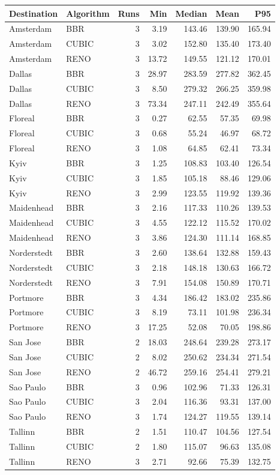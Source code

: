\begin{tabular}{llrrrrr}
\hline
Destination & Algorithm & Runs & Min & Median & Mean & P95 \\
\hline
Amsterdam & BBR & 3 & 3.19 & 143.46 & 139.90 & 165.94 \\
Amsterdam & CUBIC & 3 & 3.02 & 152.80 & 135.40 & 173.40 \\
Amsterdam & RENO & 3 & 13.72 & 149.55 & 121.12 & 170.01 \\
Dallas & BBR & 3 & 28.97 & 283.59 & 277.82 & 362.45 \\
Dallas & CUBIC & 3 & 8.50 & 279.32 & 266.25 & 359.98 \\
Dallas & RENO & 3 & 73.34 & 247.11 & 242.49 & 355.64 \\
Floreal & BBR & 3 & 0.27 & 62.55 & 57.35 & 69.98 \\
Floreal & CUBIC & 3 & 0.68 & 55.24 & 46.97 & 68.72 \\
Floreal & RENO & 3 & 1.08 & 64.85 & 62.41 & 73.34 \\
Kyiv & BBR & 3 & 1.25 & 108.83 & 103.40 & 126.54 \\
Kyiv & CUBIC & 3 & 1.85 & 105.18 & 88.46 & 129.06 \\
Kyiv & RENO & 3 & 2.99 & 123.55 & 119.92 & 139.36 \\
Maidenhead & BBR & 3 & 2.16 & 117.33 & 110.26 & 139.53 \\
Maidenhead & CUBIC & 3 & 4.55 & 122.12 & 115.52 & 170.02 \\
Maidenhead & RENO & 3 & 3.86 & 124.30 & 111.14 & 168.85 \\
Norderstedt & BBR & 3 & 2.60 & 138.64 & 132.88 & 159.43 \\
Norderstedt & CUBIC & 3 & 2.18 & 148.18 & 130.63 & 166.72 \\
Norderstedt & RENO & 3 & 7.91 & 154.08 & 150.89 & 170.71 \\
Portmore & BBR & 3 & 4.34 & 186.42 & 183.02 & 235.86 \\
Portmore & CUBIC & 3 & 8.19 & 73.11 & 101.98 & 236.34 \\
Portmore & RENO & 3 & 17.25 & 52.08 & 70.05 & 198.86 \\
San Jose & BBR & 2 & 18.03 & 248.64 & 239.28 & 273.17 \\
San Jose & CUBIC & 2 & 8.02 & 250.62 & 234.34 & 271.54 \\
San Jose & RENO & 2 & 46.72 & 259.16 & 254.41 & 279.21 \\
Sao Paulo & BBR & 3 & 0.96 & 102.96 & 71.33 & 126.31 \\
Sao Paulo & CUBIC & 3 & 2.04 & 116.36 & 93.31 & 137.00 \\
Sao Paulo & RENO & 3 & 1.74 & 124.27 & 119.55 & 139.14 \\
Tallinn & BBR & 2 & 1.51 & 110.47 & 104.56 & 127.54 \\
Tallinn & CUBIC & 2 & 1.80 & 115.07 & 96.63 & 135.08 \\
Tallinn & RENO & 3 & 2.71 & 92.66 & 75.39 & 132.75 \\
\hline
\end{tabular}
